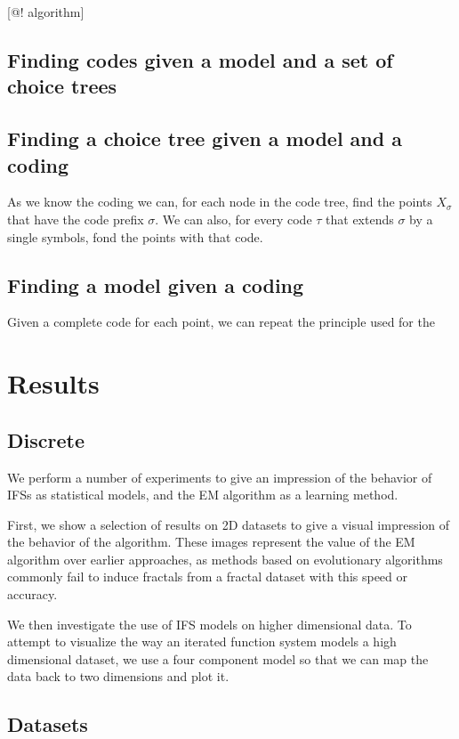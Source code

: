 \documentclass[10pt,a4paper,oneside]{article}
\theoremstyle{definition}
\begin{document}
[@! algorithm]



\subsection*{Finding codes given a model and a set of choice trees}

\subsection*{Finding a choice tree given a model and a coding}

As we know the coding we can, for each node in the code tree, find the points $X_\sigma$ that have the code prefix $\sigma$. We can also, for every code $\tau$ that extends $\sigma$ by a single symbols, fond the points with that code.

\subsection*{Finding a model given a coding}

Given a complete code for each point, we can repeat the principle used for the 

\section*{Results}

\subsection*{Discrete}
We perform a number of experiments to give an impression of the behavior of IFSs as statistical models, and the EM algorithm as a learning method. 

First, we show a selection of results on 2D datasets to give a visual impression of the behavior of the algorithm. These images represent the value of the EM algorithm over earlier approaches, as methods based on evolutionary algorithms commonly fail to induce fractals from a fractal dataset with this speed or accuracy.

We then investigate the use of IFS models on higher dimensional data. To attempt to visualize the way an iterated function system models a high dimensional dataset, we use a four component model so that we can map the data back to two dimensions and plot it.

\subsection*{Datasets}
\end{document}
